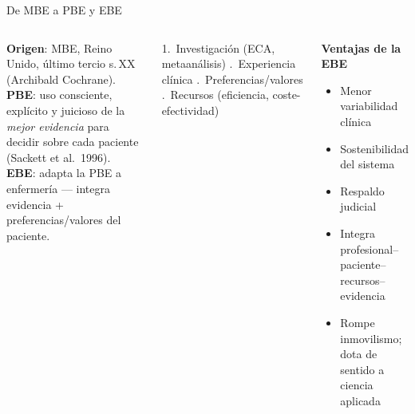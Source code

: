 \documentclass[aspectratio=169,8pt]{beamer}
\begin{document}
\begin{frame}{De MBE a PBE y EBE}
  \small
  \begin{columns}[T,onlytextwidth]
      \textbf{Origen}: MBE, Reino Unido, \'ultimo tercio s.\,XX (Archibald Cochrane).\\[3pt]
      \textbf{PBE}: uso consciente, expl\'icito y juicioso de la \emph{mejor evidencia} para decidir sobre cada paciente (Sackett et al.\ 1996).\\[3pt]
      \textbf{EBE}: adapta la PBE a enfermer\'ia --- integra evidencia + preferencias/valores del paciente.
      \vspace{0.4em}
      \begin{tcolorbox}[infobox,title=Bases conceptuales de la MBE]
        \footnotesize
        1.\ Investigaci\'on (ECA, metaan\'alisis) .\ Experiencia cl\'inica .\ Preferencias/valores .\ Recursos (eficiencia, coste-efectividad)
      \end{tcolorbox}
      \begin{tcolorbox}[tealbox]
        \footnotesize\textbf{Ventajas de la EBE}
        \begin{itemize}
          \item Menor variabilidad cl\'inica
          \item Sostenibilidad del sistema
          \item Respaldo judicial
          \item Integra profesional--paciente--recursos--evidencia
          \item Rompe inmovilismo; dota de sentido a ciencia aplicada
        \end{itemize}
      \end{tcolorbox}
    \end{columns}
\end{frame}
\end{document}
